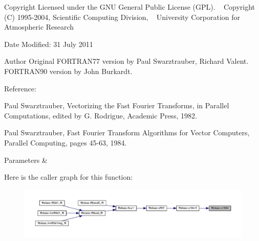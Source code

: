 \begin{DoxyCopyright}{Copyright}
Licensed under the G\+NU General Public License (G\+PL). ~\newline
 Copyright (C) 1995-\/2004, Scientific Computing Division, ~\newline
 University Corporation for Atmospheric Research 
\end{DoxyCopyright}
\begin{DoxyDate}{Date}
Modified\+: 31 July 2011 
\end{DoxyDate}
\begin{DoxyAuthor}{Author}
Original F\+O\+R\+T\+R\+A\+N77 version by Paul Swarztrauber, Richard Valent. ~\newline
 F\+O\+R\+T\+R\+A\+N90 version by John Burkardt.
\end{DoxyAuthor}
\begin{DoxyVerb}  Reference:

    Paul Swarztrauber,
    Vectorizing the Fast Fourier Transforms,
    in Parallel Computations,
    edited by G. Rodrigue,
    Academic Press, 1982.

    Paul Swarztrauber,
    Fast Fourier Transform Algorithms for Vector Computers,
    Parallel Computing, pages 45-63, 1984.\end{DoxyVerb}
 
\begin{DoxyParams}{Parameters}
{\em } & \\
\hline
\end{DoxyParams}
Here is the caller graph for this function\+:\nopagebreak
\begin{figure}[H]
\begin{center}
\leavevmode
\includegraphics[width=350pt]{namespacefftclass_a4121c0b7de23d7df058852fb75a9a31a_icgraph}
\end{center}
\end{figure}
\mbox{\label{namespacefftclass_aa356856107611ad66966fed70ede74f1}} 
